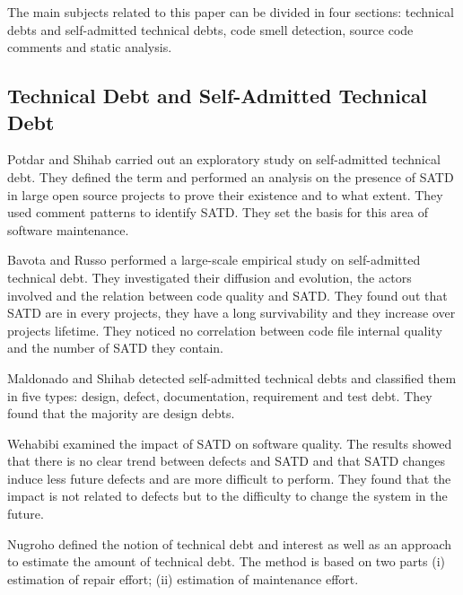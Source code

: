 %
%

The main subjects related to this paper can be divided in four sections: technical debts and self-admitted technical debts, code smell detection, source code comments and static analysis.

\subsection{Technical Debt and Self-Admitted Technical Debt}
Potdar and Shihab \cite{PotdarS14} carried out an exploratory study on self-admitted technical debt. They defined the term and performed an analysis on the presence of SATD in large open source projects to prove their existence and to what extent. They used comment patterns to identify SATD. They set the basis for this area of software maintenance.

Bavota and Russo \cite{BavotaR16} performed a large-scale empirical study on self-admitted technical debt. They investigated their diffusion and evolution, the actors involved and the relation between code quality and SATD. They found out that SATD are in every projects, they have a long survivability and they increase over projects lifetime. They noticed no correlation between code file internal quality and the number of SATD they contain.

Maldonado and Shihab \cite{MaldonadoS15} detected self-admitted technical debts and classified them in five types: design, defect, documentation, requirement and test debt. They found that the majority are design debts.

Wehabibi \etal \cite{wehaibi2016examining} examined the impact of SATD on software quality. The results showed that there is no clear trend between defects and SATD and that SATD changes induce less future defects and are more difficult to perform. They found that the impact is not related to defects but to the difficulty to change the system in the future.

Nugroho \etal \cite{nugroho2011empirical} defined the notion of technical debt and interest as well as an approach to estimate the amount of technical debt. The method is based on two parts (i) estimation of repair effort; (ii) estimation of maintenance effort.

